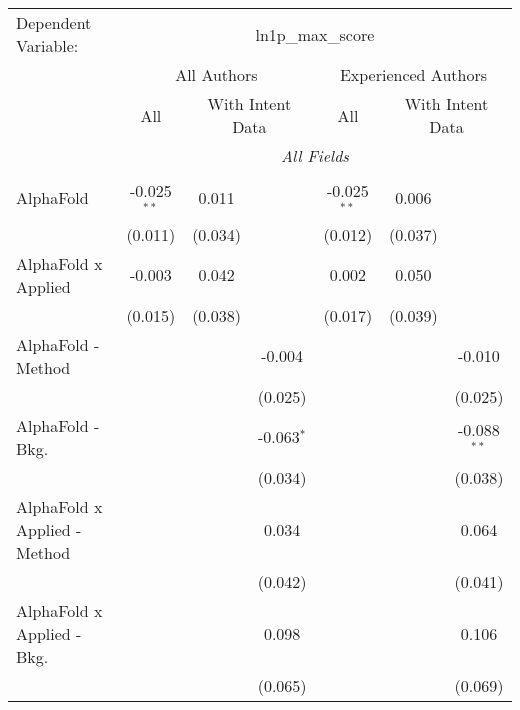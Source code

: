 \begingroup
\centering
\begin{tabular}{lcccccc}
   \tabularnewline \midrule \midrule
   Dependent Variable: & \multicolumn{6}{c}{ln1p\_max\_score}\\
 & \multicolumn{3}{c}{All Authors} & \multicolumn{3}{c}{Experienced Authors} \\
\cmidrule(lr){2-4} \cmidrule(lr){5-7}
 & \multicolumn{1}{c}{All} & \multicolumn{2}{c}{With Intent Data} & \multicolumn{1}{c}{All} & \multicolumn{2}{c}{With Intent Data} \\
\cmidrule(lr){2-2} \cmidrule(lr){3-4} \cmidrule(lr){5-5} \cmidrule(lr){6-7}
 & \multicolumn{6}{c}{\textit{All Fields}} \\ \\
   AlphaFold                      & -0.025$^{**}$ & 0.011   &              & -0.025$^{**}$ & 0.006   &   \\   
                                  & (0.011)       & (0.034) &              & (0.012)       & (0.037) &   \\   
   AlphaFold x Applied            & -0.003        & 0.042   &              & 0.002         & 0.050   &   \\   
                                  & (0.015)       & (0.038) &              & (0.017)       & (0.039) &   \\   
   AlphaFold - Method             &               &         & -0.004       &               &         & -0.010\\   
                                  &               &         & (0.025)      &               &         & (0.025)\\   
   AlphaFold - Bkg.               &               &         & -0.063$^{*}$ &               &         & -0.088$^{**}$\\   
                                  &               &         & (0.034)      &               &         & (0.038)\\   
   AlphaFold x Applied - Method   &               &         & 0.034        &               &         & 0.064\\   
                                  &               &         & (0.042)      &               &         & (0.041)\\   
   AlphaFold x Applied - Bkg.     &               &         & 0.098        &               &         & 0.106\\   
                                  &               &         & (0.065)      &               &         & (0.069)\\   

\end{tabular}
